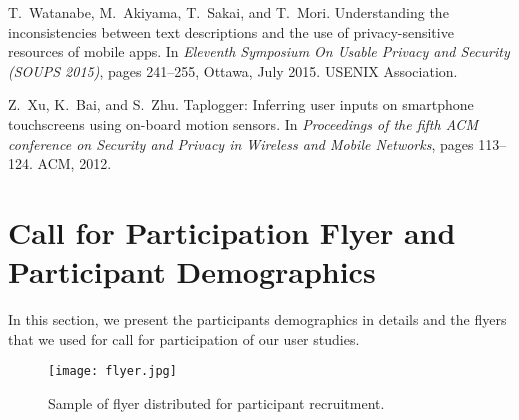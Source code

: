 \documentclass[10pt,twocolumn]{article}
\begin{document}
\begin{thebibliography}{10}
T.~Watanabe, M.~Akiyama, T.~Sakai, and T.~Mori.
\newblock Understanding the inconsistencies between text descriptions and the
  use of privacy-sensitive resources of mobile apps.
\newblock In {\em Eleventh Symposium On Usable Privacy and Security (SOUPS
  2015)}, pages 241--255, Ottawa, July 2015. USENIX Association.

Z.~Xu, K.~Bai, and S.~Zhu.
\newblock Taplogger: Inferring user inputs on smartphone touchscreens using
  on-board motion sensors.
\newblock In {\em Proceedings of the fifth ACM conference on Security and
  Privacy in Wireless and Mobile Networks}, pages 113--124. ACM, 2012.

\end{thebibliography}

\appendix
\section{Call for Participation Flyer and Participant Demographics} 
\label{demoo}
In this section, we present the participants demographics in details and the flyers that we used for call for participation of our user studies. 
\begin{figure*}[!t]
	\centering
	\texttt{[image: flyer.jpg]}
	\caption{Sample of flyer distributed for participant recruitment.}
	\label{flyer}
\end{figure*}
\end{document}
